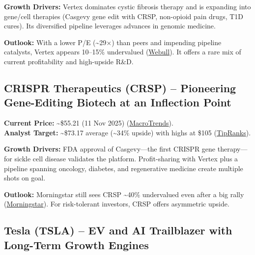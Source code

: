 \documentclass[
]{article}
\begin{document}
\textbf{Growth Drivers:} Vertex dominates cystic fibrosis therapy and is
expanding into gene/cell therapies (Casgevy gene edit with CRSP,
non-opioid pain drugs, T1D cures). Its diversified pipeline leverages
advances in genomic medicine.

\textbf{Outlook:} With a lower P/E (\textasciitilde29×) than peers and
impending pipeline catalysts, Vertex appears 10--15\% undervalued
(\href{https://www.webull.com/news/13779919312708608\#:~:text=Most\%20Popular\%20Narrative\%3A\%2011.3}{Webull}).
It offers a rare mix of current profitability and high-upside R\&D.

\hypertarget{crispr-therapeutics-crsp-pioneering-gene-editing-biotech-at-an-inflection-point}{%
\subsection{CRISPR Therapeutics (CRSP) -- Pioneering Gene-Editing
Biotech at an Inflection
Point}\label{crispr-therapeutics-crsp-pioneering-gene-editing-biotech-at-an-inflection-point}}

\textbf{Current Price:} \textasciitilde\$55.21 (11 Nov 2025)
(\href{https://www.macrotrends.net/stocks/charts/CRSP/CRISPR\%20Therapeutics/stock-price-history\#:~:text=CRISPR\%20Therapeutics\%20AG\%20,CRISPR\%20Therapeutics\%20AG\%20stock}{MacroTrends}).\\
\textbf{Analyst Target:} \textasciitilde\$73.17 average
(\textasciitilde34\% upside) with highs at \$105
(\href{https://www.tipranks.com/stocks/crsp/forecast\#:~:text=Crispr\%20Therapeutics\%20AG\%20,change\%20from\%20the}{TipRanks}).

\textbf{Growth Drivers:} FDA approval of Casgevy---the first CRISPR gene
therapy---for sickle cell disease validates the platform. Profit-sharing
with Vertex plus a pipeline spanning oncology, diabetes, and
regenerative medicine create multiple shots on goal.

\textbf{Outlook:} Morningstar still sees CRSP \textasciitilde40\%
undervalued even after a big rally
(\href{https://www.morningstar.com/people/rachel-elfman\#:~:text=Rachel\%20Elfman\%20,Elfman\%20Oct\%2010\%2C\%202025}{Morningstar}).
For risk-tolerant investors, CRSP offers asymmetric upside.

\hypertarget{tesla-tsla-ev-and-ai-trailblazer-with-long-term-growth-engines}{%
\subsection{Tesla (TSLA) -- EV and AI Trailblazer with Long-Term Growth
Engines}\label{tesla-tsla-ev-and-ai-trailblazer-with-long-term-growth-engines}}
\end{document}
